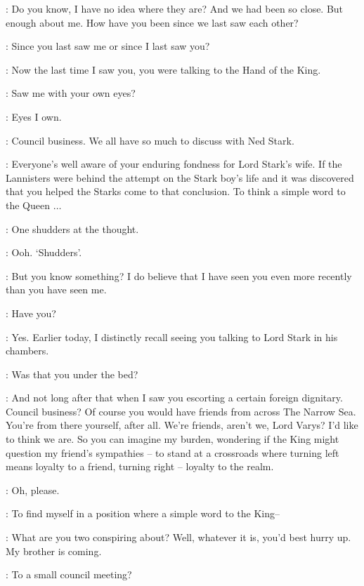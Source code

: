 \VARYS: Do you know, I have no idea where they are? And we had been so close. But enough about me. How have you been since we last saw each other? 

\LITTLEFINGER: Since you last saw me or since I last saw you? 

\VARYS: Now the last time I saw you, you were talking to the Hand of the King. 

\LITTLEFINGER: Saw me with your own eyes? 

\VARYS: Eyes I own. 

\LITTLEFINGER: Council business. We all have so much to discuss with Ned Stark. 

\VARYS: Everyone's well aware of your enduring fondness for Lord Stark's wife. If the Lannisters were behind the attempt on the Stark boy's life and it was discovered that you helped the Starks come to that conclusion. To think a simple word to the Queen $\ldots$ 

\LITTLEFINGER: One shudders at the thought. 

\VARYS: Ooh. `Shudders'. 

\LITTLEFINGER: But you know something? I do believe that I have seen you even more recently than you have seen me. 

\VARYS: Have you? 

\LITTLEFINGER: Yes. Earlier today, I distinctly recall seeing you talking to Lord Stark in his chambers. 

\VARYS: Was that you under the bed? 

\LITTLEFINGER: And not long after that when I saw you escorting a certain foreign dignitary. Council business? Of course you would have friends from across The Narrow Sea. You're from there yourself, after all. We're friends, aren't we, Lord Varys? I'd like to think we are. So you can imagine my burden, wondering if the King might question my friend's sympathies -- to stand at a crossroads where turning left means loyalty to a friend, turning right -- loyalty to the realm. 

\VARYS: Oh, please. 

\LITTLEFINGER: To find myself in a position where a simple word to the King-- 


\RENLY: What are you two conspiring about? Well, whatever it is, you'd best hurry up. My brother is coming.  

\LITTLEFINGER: To a small council meeting? 


